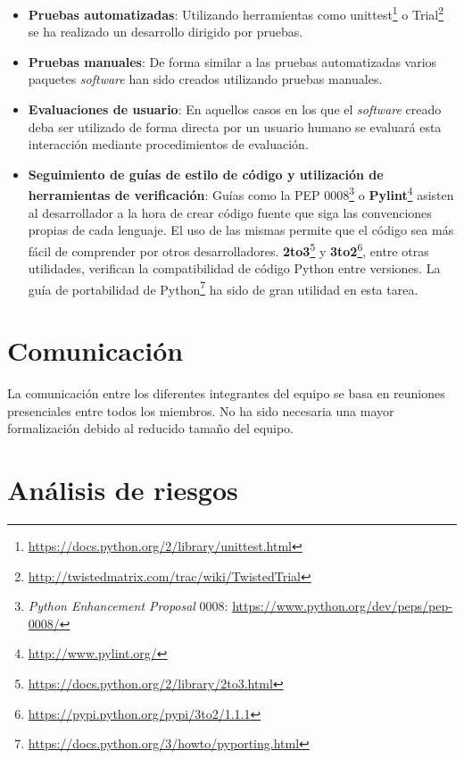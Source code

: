 \begin{itemize}
\item \textbf{Pruebas automatizadas}: Utilizando herramientas como unittest\footnote{\href{https://docs.python.org/2/library/unittest.html}{https://docs.python.org/2/library/unittest.html}} o Trial\footnote{\href{http://twistedmatrix.com/trac/wiki/TwistedTrial}{http://twistedmatrix.com/trac/wiki/TwistedTrial}} se ha realizado un desarrollo dirigido por pruebas.
\item \textbf{Pruebas manuales}: De forma similar a las pruebas automatizadas varios paquetes \textit{software} han sido creados utilizando pruebas manuales.
\item \textbf{Evaluaciones de usuario}: En aquellos casos en los que el \textit{software} creado deba ser utilizado de forma directa por un usuario humano se evaluará esta interacción mediante procedimientos de evaluación.
\item \textbf{Seguimiento de guías de estilo de código y utilización de herramientas de verificación}: Guías como la PEP 0008\footnote{\textit{Python Enhancement Proposal} 0008: \href{https://www.python.org/dev/peps/pep-0008/}{https://www.python.org/dev/peps/pep-0008/}} o \textbf{Pylint}\footnote{\href{http://www.pylint.org/}{http://www.pylint.org/}} asisten al desarrollador a la hora de crear código fuente que siga las convenciones propias de cada lenguaje. El uso de las mismas permite que el código sea más fácil de comprender por otros desarrolladores. \textbf{2to3}\footnote{\href{https://docs.python.org/2/library/2to3.html}{https://docs.python.org/2/library/2to3.html}} y \textbf{3to2}\footnote{\href{https://pypi.python.org/pypi/3to2/1.1.1}{https://pypi.python.org/pypi/3to2/1.1.1}}, entre otras utilidades, verifican la compatibilidad de código Python entre versiones. La guía de portabilidad de Python\footnote{\href{https://docs.python.org/3/howto/pyporting.html}{https://docs.python.org/3/howto/pyporting.html}} ha sido de gran utilidad en esta tarea.
\end{itemize}

\section{Comunicación}

La comunicación entre los diferentes integrantes del equipo se basa en reuniones presenciales entre todos los miembros. No ha sido necesaria una mayor formalización debido al reducido tamaño del equipo.


\section{Análisis de riesgos}

